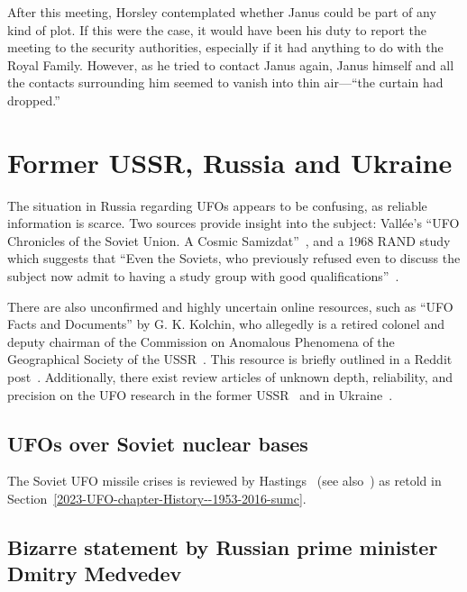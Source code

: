 After this meeting, Horsley contemplated whether Janus could be part of any kind of plot. If this were the case, it would have been his duty to report the meeting to the security authorities, especially if it had anything to do with the Royal Family. However, as he tried to contact Janus again, Janus himself and all the contacts surrounding him seemed to vanish into thin air---``the curtain had dropped.''





\section{Former USSR, Russia and Ukraine}
\label{2023-UFO-part-Perception-types-Russia}

The situation in Russia regarding UFOs appears to be confusing, as reliable information is scarce.
Two sources provide insight into the subject: Vall\'ee's
``UFO Chronicles of the Soviet Union. A Cosmic Samizdat''~\cite{Vallee1992Feb}, and a 1968 RAND study which suggests that
``Even the Soviets, who previously refused even to discuss the subject now admit to having a study group with good qualifications''~\cite[p.~6]{Kocher-RAND-1968Jan}.

There are also unconfirmed and highly uncertain online resources, such as ``UFO Facts and Documents'' by G. K. Kolchin,
who allegedly is a retired colonel and deputy chairman of the Commission on Anomalous Phenomena of the Geographical
 Society of the USSR~\cite{Kolchin2018Feb}. This resource is briefly outlined in a Reddit post~\cite{TypewriterTourist2023Jan}.
 Additionally, there exist review articles of unknown depth, reliability, and precision on the
UFO research in the former USSR~\cite{Alexeyev97,PlatovSokolov-2000} and in Ukraine~\cite{Gershtein2015,Bilyk2016Sep}.


\subsection{UFOs over Soviet nuclear bases}

The Soviet UFO missile crises
is reviewed by Hastings~\cite[Chapter~23]{Hastings2008Jan} (see also~\cite{ABC-transcript-1994,Huneeus2011Jan,Hvar2012})
as retold in Section~\ref{2023-UFO-chapter-History--1953-2016-sumc}.


\subsection{Bizarre statement by Russian prime minister Dmitry Medvedev}

